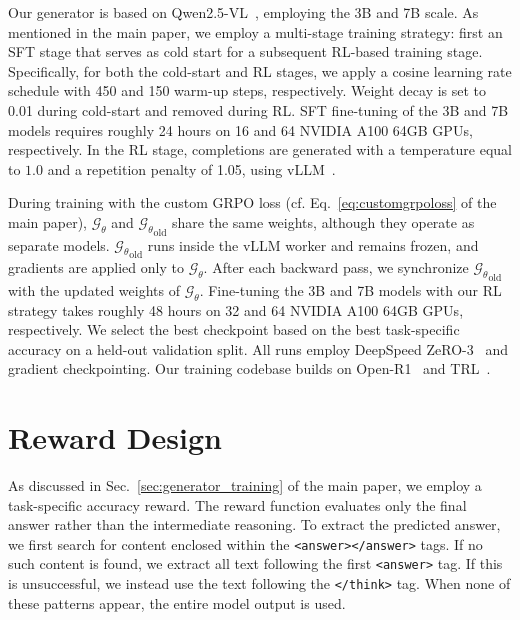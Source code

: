 Our generator is based on Qwen2.5-VL~\cite{bai2025qwen2}, employing the 3B and 7B scale. As mentioned in the main paper, we employ a multi-stage training strategy: first an SFT stage that serves as cold start for a subsequent RL-based training stage.  Specifically, for both the cold-start and RL stages, we apply a cosine learning rate schedule with 450 and 150 warm-up steps, respectively. Weight decay is set to 0.01 during cold-start and removed during RL. 
SFT fine-tuning of the 3B and 7B models requires roughly 24 hours on 16 and 64 NVIDIA A100 64GB GPUs, respectively.
In the RL stage, completions are generated with a temperature equal to $1.0$ and a repetition penalty of 1.05, using vLLM~\cite{kwon2023efficient}. 

During training with the custom GRPO loss (cf. Eq.~\ref{eq:customgrpoloss} of the main paper), $\mathcal{G}_\theta$ and ${\mathcal{G}_\theta}_{\text{old}}$ share the same weights, although they operate as separate models. ${\mathcal{G}_\theta}_{\text{old}}$ runs inside the vLLM worker and remains frozen, and gradients are applied only to $\mathcal{G}_\theta$. After each backward pass, we synchronize ${\mathcal{G}_\theta}_{\text{old}}$ with the updated weights of $\mathcal{G}_\theta$. Fine-tuning the 3B and 7B models with our RL strategy takes roughly 48 hours on 32 and 64 NVIDIA A100 64GB GPUs, respectively. We select the best checkpoint based on the best task-specific accuracy on a held-out validation split. All runs employ DeepSpeed ZeRO-3~\cite{rajbhandari2020zero} and gradient checkpointing. Our training codebase builds on Open-R1~\cite{openr1} and TRL~\cite{vonwerra2022trl}.  

\section{Reward Design}
As discussed in Sec.~\ref{sec:generator_training} of the main paper, we employ a task-specific accuracy reward. The reward function evaluates only the final answer rather than the intermediate reasoning. To extract the predicted answer, we first search for content enclosed within the \texttt{<answer></answer>} tags. If no such content is found, we extract all text following the first \texttt{<answer>} tag. If this is unsuccessful, we instead use the text following the \texttt{</think>} tag. When none of these patterns appear, the entire model output is used. 

